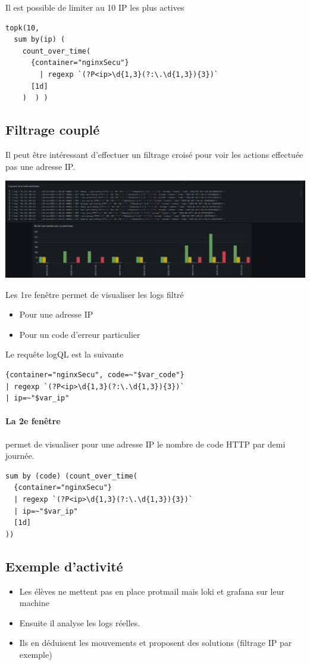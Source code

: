 \documentclass[french, 12pt]{article}%
\newcommand{\itemE}{\item[$\bullet$]}
\begin{document}
\vspace{0.5cm}
Il est possible de limiter au 10 IP les plus actives

\begin{lstlisting}[style=commande]
topk(10,
  sum by(ip) (
    count_over_time(
      {container="nginxSecu"} 
        | regexp `(?P<ip>\d{1,3}(?:\.\d{1,3}){3})`
      [1d]
    )  ) )
\end{lstlisting}
\subsection{Filtrage couplé}

Il peut être intéressant d'effectuer un filtrage croisé pour voir les actions effectuée pas une adresse IP. 


\begin{center}
\includegraphics[scale=0.3]{./ressource/filtrageCroise}
\end{center}

Les 1re fenêtre permet de visualiser les logs filtré
\begin{itemize}
\itemE Pour une adresse IP
\itemE Pour un code d'erreur particulier
\end{itemize}

Le requête logQL est la suivante 
\begin{lstlisting}[style=commande]
{container="nginxSecu", code=~"$var_code"}
| regexp `(?P<ip>\d{1,3}(?:\.\d{1,3}){3})`
| ip=~"$var_ip"
\end{lstlisting}


\paragraph{La 2e fenêtre} permet de visualiser pour une adresse IP le nombre de code HTTP par demi journée.

\begin{lstlisting}[style=commande]
sum by (code) (count_over_time(
  {container="nginxSecu"}
  | regexp `(?P<ip>\d{1,3}(?:\.\d{1,3}){3})`
  | ip=~"$var_ip"
  [1d]
))
\end{lstlisting}


\subsection{Exemple d'activité}

\begin{itemize}
\itemE Les élèves ne mettent pas en place protmail mais loki et grafana sur leur machine
\itemE Ensuite il analyse les logs réelles. 

\itemE Ils en déduisent les mouvements et proposent des solutions (filtrage IP par exemple)
\end{itemize}
\end{document}

